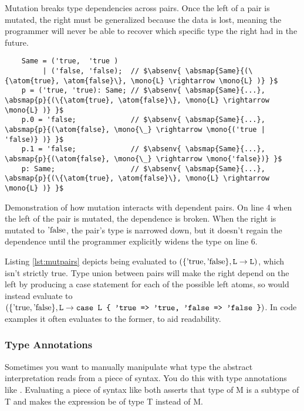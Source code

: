 \documentclass[12pt,twoside]{report}
\begin{document}
Mutation breaks type dependencies across pairs. Once the left of a pair is mutated, the right must be generalized because the data is lost, meaning the programmer will never be able to recover which specific type the right had in the future.

\begin{listing}[H]
  \begin{verbatim}
    Same = ('true,  'true )
         | ('false, 'false);  // $\absenv{ \absmap{Same}{(\{\atom{true}, \atom{false}\}, \mono{L} \rightarrow \mono{L} )} }$
    p = ('true, 'true): Same; // $\absenv{ \absmap{Same}{...}, \absmap{p}{(\{\atom{true}, \atom{false}\}, \mono{L} \rightarrow \mono{L} )} }$
    p.0 = 'false;             // $\absenv{ \absmap{Same}{...}, \absmap{p}{(\atom{false}, \mono{\_} \rightarrow \mono{('true | 'false)} )} }$
    p.1 = 'false;             // $\absenv{ \absmap{Same}{...}, \absmap{p}{(\atom{false}, \mono{\_} \rightarrow \mono{'false})} }$
    p: Same;                  // $\absenv{ \absmap{Same}{...}, \absmap{p}{(\{\atom{true}, \atom{false}\}, \mono{L} \rightarrow \mono{L} )} }$
  \end{verbatim}
  \caption{Demonstration of how mutation interacts with dependent pairs. On line 4 when the left of the pair is mutated, the dependence is broken. When the right is mutated to $\atom{false}$, the pair's type is narrowed down, but it doesn't regain the dependence until the programmer explicitly widens the type on line 6.}
  \label{lst:mutpairs}
\end{listing}

Listing \ref{lst:mutpairs} depicts  being evaluated to $(\{\text{'true}, \text{'false}\}, \text{\texttt{L}} \rightarrow \text{\texttt{L}})$, which isn't strictly true. Type union between pairs will make the right depend on the left by producing a case statement for each of the possible left atoms, so  would instead evaluate to $(\{\text{'true}, \text{'false}\}, \text{\texttt{L}} \rightarrow \text{\texttt{case L \{ 'true => 'true, 'false => 'false \}}})$. In code examples it often evaluates to the former, to aid readability.

\subsubsection{Type Annotations}
Sometimes you want to manually manipulate what type the abstract interpretation reads from a piece of syntax. You do this with type annotations like . Evaluating a piece of syntax like  both asserts that type of M is a subtype of T and makes the expression be of type T instead of M.
\end{document}
